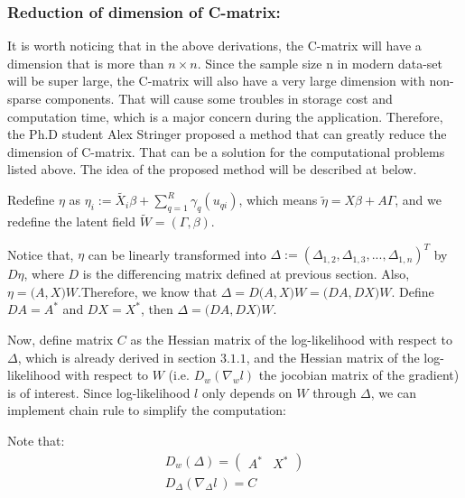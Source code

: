 \documentclass[]{article}
\begin{document}
\hypertarget{reduction-of-dimension-of-c-matrix}{%
\subsubsection{Reduction of dimension of
C-matrix:}\label{reduction-of-dimension-of-c-matrix}}

It is worth noticing that in the above derivations, the C-matrix will
have a dimension that is more than \(n\times n\). Since the sample size
n in modern data-set will be super large, the C-matrix will also have a
very large dimension with non-sparse components. That will cause some
troubles in storage cost and computation time, which is a major concern
during the application. Therefore, the Ph.D student Alex Stringer
proposed a method that can greatly reduce the dimension of C-matrix.
That can be a solution for the computational problems listed above. The
idea of the proposed method will be described at below.

Redefine \(\eta\) as
\(\eta_i := \tilde{X_i}\beta + \sum_{q=1}^{R}{\gamma_q(u_{qi})}\), which
means \(\tilde{\eta}= X\beta+A\Gamma\), and we redefine the latent field
\(\tilde{W} = (\Gamma,\beta)\).

Notice that, \(\eta\) can be linearly transformed into
\(\Delta:=(\Delta_{1,2},\Delta_{1,3},...,\Delta_{1,n})^T\) by \(D\eta\),
where \(D\) is the differencing matrix defined at previous section.
Also, \(\eta = \bigg(A,X\bigg)W\).Therefore, we know that
\(\Delta = D\bigg(A,X\bigg)W = \bigg(DA,DX\bigg)W\). Define \(DA = A^*\)
and \(DX = X^*\), then \(\Delta =\bigg(DA,DX\bigg)W\).

Now, define matrix \(C\) as the Hessian matrix of the log-likelihood
with respect to \(\Delta\), which is already derived in section
\(3.1.1\), and the Hessian matrix of the log-likelihood with respect to
\(W\) (i.e. \(D_w(\nabla_wl)\) the jocobian matrix of the gradient) is
of interest. Since log-likelihood \(l\) only depends on \(W\) through
\(\Delta\), we can implement chain rule to simplify the computation:

Note that: \begin{equation}\begin{aligned}\label{eqn:ReductofD1}
D_w{(\Delta)} = \begin{pmatrix} A^{*} & X^{*} \end{pmatrix} \\
D_\Delta (\nabla_\Delta l \ ) = C
\end{aligned}\end{equation}
\end{document}
